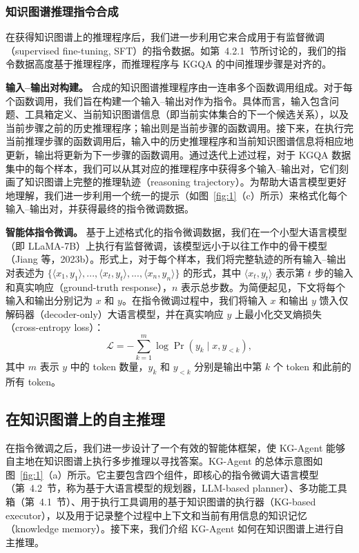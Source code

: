 \documentclass[11pt,UTF8,fontset=fandol]{ctexart}
\begin{document}
\subsubsection{知识图谱推理指令合成}

在获得知识图谱上的推理程序后，我们进一步利用它来合成用于有监督微调（supervised fine-tuning, SFT）的指令数据。如第~4.2.1~节所讨论的，我们的指令数据高度基于推理程序，而推理程序与 KGQA 的中间推理步骤是对齐的。

\textbf{输入--输出对构建。}
合成的知识图谱推理程序由一连串多个函数调用组成。对于每个函数调用，我们旨在构建一个输入--输出对作为指令。具体而言，输入包含问题、工具箱定义、当前知识图谱信息（即当前实体集合的下一个候选关系），以及当前步骤之前的历史推理程序；输出则是当前步骤的函数调用。接下来，在执行完当前推理步骤的函数调用后，输入中的历史推理程序和当前知识图谱信息将相应地更新，输出将更新为下一步骤的函数调用。通过迭代上述过程，对于 KGQA 数据集中的每个样本，我们可以从其对应的推理程序中获得多个输入--输出对，它们刻画了知识图谱上完整的推理轨迹（reasoning trajectory）。为帮助大语言模型更好地理解，我们进一步利用一个统一的提示（如图~\ref{fig:1}（c）所示）来格式化每个输入--输出对，并获得最终的指令微调数据。

\textbf{智能体指令微调。}
基于上述格式化的指令微调数据，我们在一个小型大语言模型（即 LLaMA-7B）上执行有监督微调，该模型远小于以往工作中的骨干模型（Jiang 等，2023b）。形式上，对于每个样本，我们将完整轨迹的所有输入--输出对表述为 $\{\langle x_1, y_1 \rangle, ..., \langle x_t, y_t \rangle, ..., \langle x_n, y_n \rangle\}$ 的形式，其中 $\langle x_t, y_t \rangle$ 表示第 $t$ 步的输入和真实响应（ground-truth response），$n$ 表示总步数。为简便起见，下文将每个输入和输出分别记为 $x$ 和 $y$。在指令微调过程中，我们将输入 $x$ 和输出 $y$ 馈入仅解码器（decoder-only）大语言模型，并在真实响应 $y$ 上最小化交叉熵损失（cross-entropy loss）：
\begin{equation}
\mathcal{L} = -\sum_{k=1}^{m} \log \Pr(y_k \mid x, y_{<k}),
\end{equation}
其中 $m$ 表示 $y$ 中的 token 数量，$y_k$ 和 $y_{<k}$ 分别是输出中第 $k$ 个 token 和此前的所有 token。

\subsection{在知识图谱上的自主推理}

在指令微调之后，我们进一步设计了一个有效的智能体框架，使 KG-Agent 能够自主地在知识图谱上执行多步推理以寻找答案。KG-Agent 的总体示意图如图~\ref{fig:1}（a）所示。它主要包含四个组件，即核心的指令微调大语言模型（第~4.2~节，称为基于大语言模型的规划器，LLM-based planner）、多功能工具箱（第~4.1~节）、用于执行工具调用的基于知识图谱的执行器（KG-based executor），以及用于记录整个过程中上下文和当前有用信息的知识记忆（knowledge memory）。接下来，我们介绍 KG-Agent 如何在知识图谱上进行自主推理。
\end{document}
